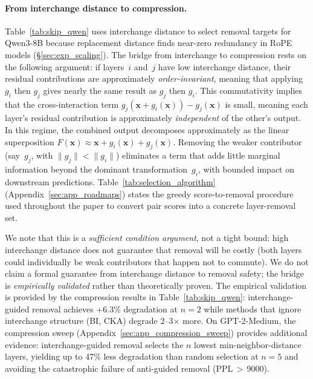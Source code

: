 \documentclass{article}
\begin{document}
\paragraph{From interchange distance to compression.}
Table~\ref{tab:skip_qwen} uses interchange distance to select removal targets for Qwen3-8B because replacement distance finds near-zero redundancy in RoPE models (\S\ref{sec:exp_scaling}). The bridge from interchange to compression rests on the following argument: if layers~$i$ and~$j$ have low interchange distance, their residual contributions are approximately \emph{order-invariant}, meaning that applying $g_i$ then $g_j$ gives nearly the same result as $g_j$ then $g_i$. This commutativity implies that the cross-interaction term $g_j(\mathbf{x} + g_i(\mathbf{x})) - g_j(\mathbf{x})$ is small, meaning each layer's residual contribution is approximately \emph{independent} of the other's output. In this regime, the combined output decomposes approximately as the linear superposition $F(\mathbf{x}) \approx \mathbf{x} + g_i(\mathbf{x}) + g_j(\mathbf{x})$. Removing the weaker contributor (say~$g_j$, with $\|g_j\| < \|g_i\|$) eliminates a term that adds little marginal information beyond the dominant transformation~$g_i$, with bounded impact on downstream predictions. Table~\ref{tab:selection_algorithm} (Appendix~\ref{sec:app_roadmaps}) states the greedy score-to-removal procedure used throughout the paper to convert pair scores into a concrete layer-removal set.

We note that this is a \emph{sufficient condition argument}, not a tight bound: high interchange distance does not guarantee that removal will be costly (both layers could individually be weak contributors that happen not to commute). We do not claim a formal guarantee from interchange distance to removal safety; the bridge is \emph{empirically validated} rather than theoretically proven. The empirical validation is provided by the compression results in Table~\ref{tab:skip_qwen}: interchange-guided removal achieves +6.3\% degradation at $n{=}2$ while methods that ignore interchange structure (BI, CKA) degrade 2--3$\times$ more. On GPT-2-Medium, the compression sweep (Appendix~\ref{sec:app_compression_sweep}) provides additional evidence: interchange-guided removal selects the $n$ lowest min-neighbor-distance layers, yielding up to 47\% less degradation than random selection at $n{=}5$ and avoiding the catastrophic failure of anti-guided removal (PPL\,$>$\,9000).
\end{document}
